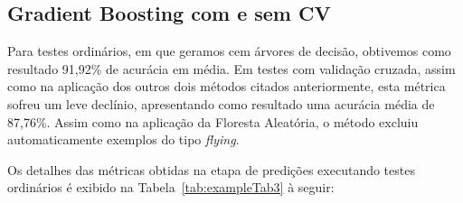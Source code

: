 \documentclass[12pt]{article}
\begin{document}
\vspace{1.5cm}
\subsection{Gradient Boosting com e sem CV}

Para testes ordinários, em que geramos cem árvores de decisão, obtivemos como resultado 91,92\% de acurácia em média. Em testes com validação cruzada, assim como na aplicação dos outros dois métodos citados anteriormente, esta métrica sofreu um leve declínio, apresentando como resultado uma acurácia média de 87,76\%. Assim como na aplicação da Floresta Aleatória, o método excluiu automaticamente exemplos do tipo \emph{flying}.

Os detalhes das métricas obtidas na etapa de predições executando testes ordinários é exibido na Tabela~\ref{tab:exampleTab3} à seguir:
\end{document}
